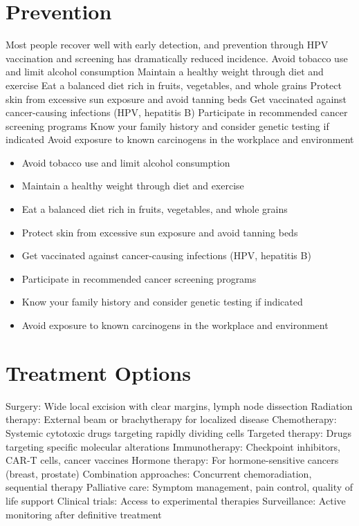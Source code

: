 \section{Prevention}
Most people recover well with early detection, and prevention through HPV vaccination and screening has dramatically reduced incidence. Avoid tobacco use and limit alcohol consumption Maintain a healthy weight through diet and exercise Eat a balanced diet rich in fruits, vegetables, and whole grains Protect skin from excessive sun exposure and avoid tanning beds Get vaccinated against cancer-causing infections (HPV, hepatitis B) Participate in recommended cancer screening programs Know your family history and consider genetic testing if indicated Avoid exposure to known carcinogens in the workplace and environment

\begin{itemize}[noitemsep]
  \item Avoid tobacco use and limit alcohol consumption
  \item Maintain a healthy weight through diet and exercise
  \item Eat a balanced diet rich in fruits, vegetables, and whole grains
  \item Protect skin from excessive sun exposure and avoid tanning beds
  \item Get vaccinated against cancer-causing infections (HPV, hepatitis B)
  \item Participate in recommended cancer screening programs
  \item Know your family history and consider genetic testing if indicated
  \item Avoid exposure to known carcinogens in the workplace and environment
\end{itemize}
\section{Treatment Options}
Surgery: Wide local excision with clear margins, lymph node dissection Radiation therapy: External beam or brachytherapy for localized disease Chemotherapy: Systemic cytotoxic drugs targeting rapidly dividing cells Targeted therapy: Drugs targeting specific molecular alterations Immunotherapy: Checkpoint inhibitors, CAR-T cells, cancer vaccines Hormone therapy: For hormone-sensitive cancers (breast, prostate) Combination approaches: Concurrent chemoradiation, sequential therapy Palliative care: Symptom management, pain control, quality of life support Clinical trials: Access to experimental therapies Surveillance: Active monitoring after definitive treatment

